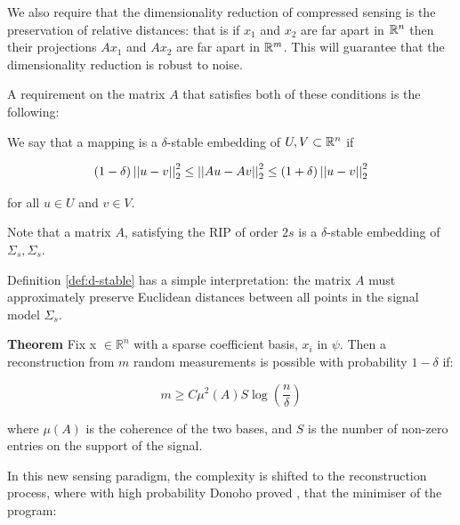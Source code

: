 \documentclass{article}
\begin{document}
\begin{remark} [Stability]
We also require that the dimensionality reduction of compressed sensing is the preservation of relative distances: that is if \(x_1\) and \(x_2\) are far apart in \({\mathbb{R}}^n\) then their projections \(Ax_1\) and \(Ax_2\) are far apart in \({\mathbb{R}}^m\). This will guarantee that the dimensionality reduction is robust to noise. 
\end{remark}

A requirement on the matrix \(A\) that satisfies both of these conditions is the following:

\begin{definition}
We say that a mapping is a \(\delta\)-stable embedding of \(U,V \subset {\mathbb{R}}^n\) if

\begin{equation}
\left(1 - \delta \right) \left|\left|u-v\right|\right|_2^2 \leq \left|\left|Au-Av\right|\right|_2^2 \leq \left(1 + \delta\right) \left|\left|u-v\right|\right|_2^2
\end{equation}

for all \(u \in U\) and \(v \in V\). 
\label{def:d-stable}
\end{definition} 

\begin{remark}
Note that a matrix \(A\), satisfying the RIP of order \(2s\) is a \(\delta\)-stable embedding of \(\Sigma_s, \Sigma_s\). 
\end{remark}

\begin{remark}
Definition \ref{def:d-stable} has a simple interpretation: the matrix \(A\) must approximately preserve Euclidean distances between all points in the signal model \(\Sigma_s\).
\end{remark}



\textbf{Theorem} \cite{Candes2006}
Fix x \(\in \mathbb{R}^n\) with a sparse coefficient basis, \(x_{i}\) in \(\psi\). Then a reconstruction from \(m\) random measurements is possible with probability \(1 - \delta\) if: 

\begin{equation}
m \geq C \mu^2(A) S \log\left(\frac{n}{\delta}\right)
\end{equation}
\label{minsamples}

where \( \mu(A)\) is the coherence of the two bases, and \(S\) is the number of non-zero entries on the support of the signal. 

In this new sensing paradigm, the complexity is shifted to the reconstruction process, where with high probability Donoho proved \cite{donoho2004neighborly}, that the minimiser of the program:
\end{document}
